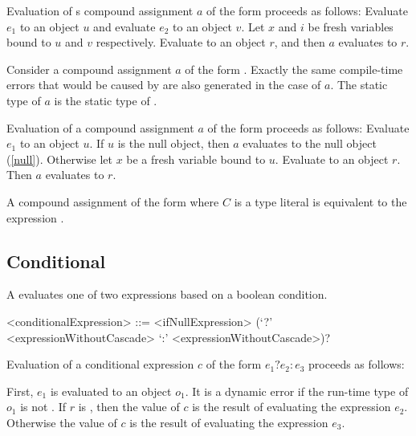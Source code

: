\documentclass[makeidx]{article}
\begin{document}
{\LMHash{}%
Evaluation of s compound assignment $a$ of the form
proceeds as follows:
Evaluate $e_1$ to an object $u$ and evaluate $e_2$ to an object $v$.
Let $x$ and $i$ be fresh variables bound to $u$ and $v$ respectively.
Evaluate  to an object $r$,
and then $a$ evaluates to $r$.
\EndCase

\LMHash{}%
Consider a compound assignment $a$ of the form .
Exactly the same compile-time errors that would be caused by
are also generated in the case of $a$.
The static type of $a$ is the static type of .

\LMHash{}%
Evaluation of a compound assignment $a$ of the form
proceeds as follows:
Evaluate $e_1$ to an object $u$.
If $u$ is the null object, then $a$ evaluates to the null object (\ref{null}).
Otherwise let $x$ be a fresh variable bound to $u$.
Evaluate  to an object $r$.
Then $a$ evaluates to $r$.
\EndCase

\LMHash{}%
A compound assignment of the form 
where $C$ is a type literal
is equivalent to the expression .
\EndCase


\subsection{Conditional}

\LMHash{}%
A  evaluates one of two expressions
based on a boolean condition.

\begin{grammar}
<conditionalExpression> ::= <ifNullExpression>
  \gnewline{} (`?' <expressionWithoutCascade> `:' <expressionWithoutCascade>)?
\end{grammar}

\LMHash{}%
Evaluation of a conditional expression $c$ of the form $e_1 ? e_2 : e_3$
proceeds as follows:

\LMHash{}%
First, $e_1$ is evaluated to an object $o_1$.
It is a dynamic error if the run-time type of $o_1$ is not .
If $r$ is \TRUE, then the value of $c$ is
the result of evaluating the expression $e_2$.
Otherwise the value of $c$ is the result of evaluating the expression $e_3$.

}
\end{document}
